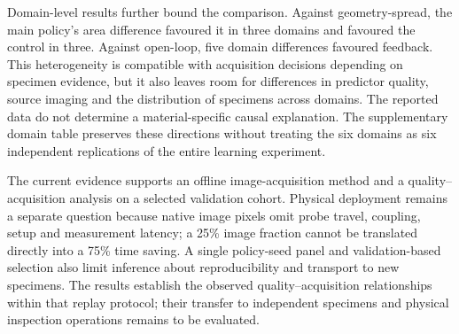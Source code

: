 Domain-level results further bound the comparison. Against geometry-spread, the main policy's area difference favoured it in three domains and favoured the control in three. Against open-loop, five domain differences favoured feedback. This heterogeneity is compatible with acquisition decisions depending on specimen evidence, but it also leaves room for differences in predictor quality, source imaging and the distribution of specimens across domains. The reported data do not determine a material-specific causal explanation. The supplementary domain table preserves these directions without treating the six domains as six independent replications of the entire learning experiment.

The current evidence supports an offline image-acquisition method and a quality--acquisition analysis on a selected validation cohort. Physical deployment remains a separate question because native image pixels omit probe travel, coupling, setup and measurement latency; a 25\% image fraction cannot be translated directly into a 75\% time saving. A single policy-seed panel and validation-based selection also limit inference about reproducibility and transport to new specimens. The results establish the observed quality--acquisition relationships within that replay protocol; their transfer to independent specimens and physical inspection operations remains to be evaluated.
